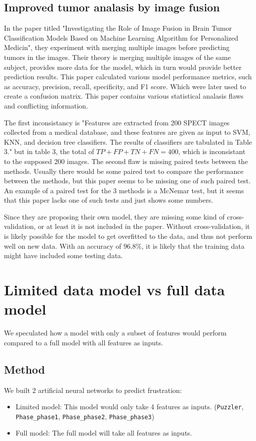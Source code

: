 \documentclass[12pt]{article}
\begin{document}
\newpage
\subsection{Improved tumor analasis by image fusion}
In the paper titled "Investigating the Role of Image Fusion in Brain Tumor Classification Models Based on Machine Learning Algorithm for Personalized Medicin"\cite{Namn2022},
they experiment with merging multiple images before predicting tumors in the images.
Their theory is merging multiple images of the same subject, provides more data for the model, which in turn would provide better prediction results.
This paper calculated various model performance metrics, such as accuracy, precision, recall, specificity, and F1 score.
Which were later used to create a confusion matrix.
This paper contains various statistical analasis flaws and conflicting information.

The first inconsistancy is "Features are extracted from 200 SPECT images collected from a medical database, and these features are given as input to SVM, KNN, and decision tree classifiers. The results of classifiers are tabulated in Table 3."
but in table 3, the total of $TP + FP + TN + FN = 400$, which is inconsistant to the supposed 200 images.
The second flaw is missing paired tests between the methods.
Usually there would be some paired test to compare the performance between the methods,
but this paper seems to be missing one of such paired test.
An example of a paired test for the 3 methods is a McNemar test,
but it seems that this paper lacks one of such tests and just shows some numbers.

Since they are proposing their own model, they are missing some kind of cross-validation, or at least it is not included in the paper.
Without cross-validation, it is likely possible for the model to get overfitted to the data, and thus not perform well on new data.
With an accuracy of $96.8\%$, it is likely that the training data might have included some testing data.

\newpage
\section{Limited data model vs full data model}
We speculated how a model with only a subset of features would perform compared to a full model with all features as inputs.

\subsection{Method}
We built 2 artificial neural networks to predict frustration:
\begin{itemize}
  \item Limited model: This model would only take 4 features as inputs. (\texttt{Puzzler}, \texttt{Phase\_phase1}, \texttt{Phase\_phase2}, \texttt{Phase\_phase3})
  \item Full model: The full model will take all features as inputs.
\end{itemize}
\end{document}
